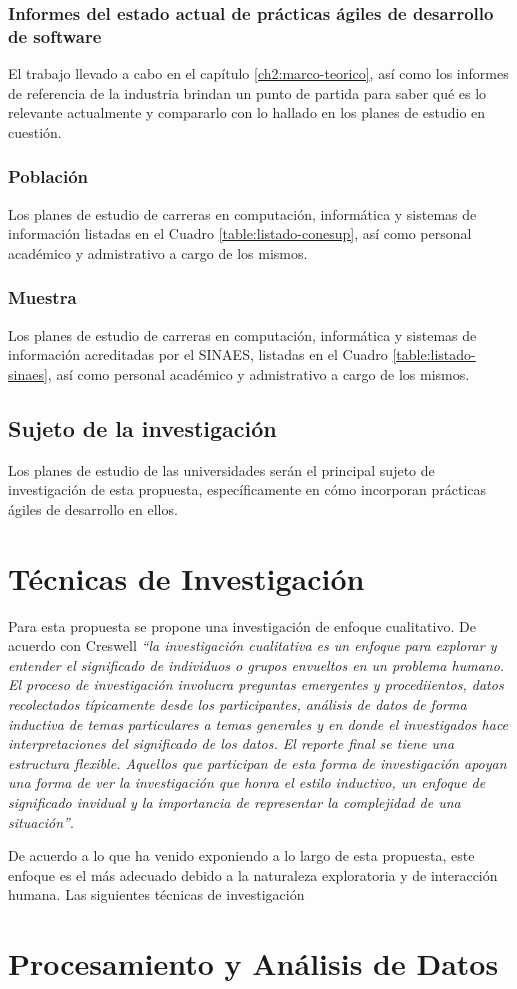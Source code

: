 \subsubsection{Informes del estado actual de prácticas ágiles de desarrollo de software}
El trabajo llevado a cabo en el capítulo \ref{ch2:marco-teorico}, así como los informes de referencia de la industria \cite{version-one, puppet-devops} brindan un punto de partida para saber qué es lo relevante actualmente y compararlo con lo hallado en los planes de estudio en cuestión.


\subsubsection{Población}
Los planes de estudio de carreras en computación, informática y sistemas de información listadas en el Cuadro \ref{table:listado-conesup}, así como personal académico y admistrativo a cargo de los mismos.

\subsubsection{Muestra}
Los planes de estudio de carreras en computación, informática y sistemas de información acreditadas por el SINAES, listadas en el Cuadro \ref{table:listado-sinaes}, así como personal académico y admistrativo a cargo de los mismos.

\subsection{Sujeto de la investigación}
Los planes de estudio de las universidades serán el principal sujeto de investigación de esta propuesta, específicamente en cómo incorporan prácticas ágiles de desarrollo en ellos.


\section{Técnicas de Investigación}
Para esta propuesta se propone una investigación de enfoque cualitativo. De acuerdo con  Creswell \cite{creswell} \emph{``la investigación cualitativa es un enfoque para explorar y entender el significado de individuos o grupos envueltos en un problema humano. El proceso de investigación involucra preguntas emergentes y procediientos, datos recolectados típicamente desde los participantes, análisis de datos de forma inductiva de temas particulares a temas generales y en donde el investigados hace interpretaciones del significado de los datos. El reporte final se tiene una estructura flexible. Aquellos que participan de esta forma de investigación apoyan una forma de ver la investigación que honra el estilo inductivo, un enfoque de significado invidual y la importancia de representar la complejidad de una situación''}.

De acuerdo a lo que ha venido exponiendo a lo largo de esta propuesta, este enfoque es el más adecuado debido a la naturaleza exploratoria y de interacción humana. Las siguientes técnicas de investigación 


\section{Procesamiento y Análisis de Datos}